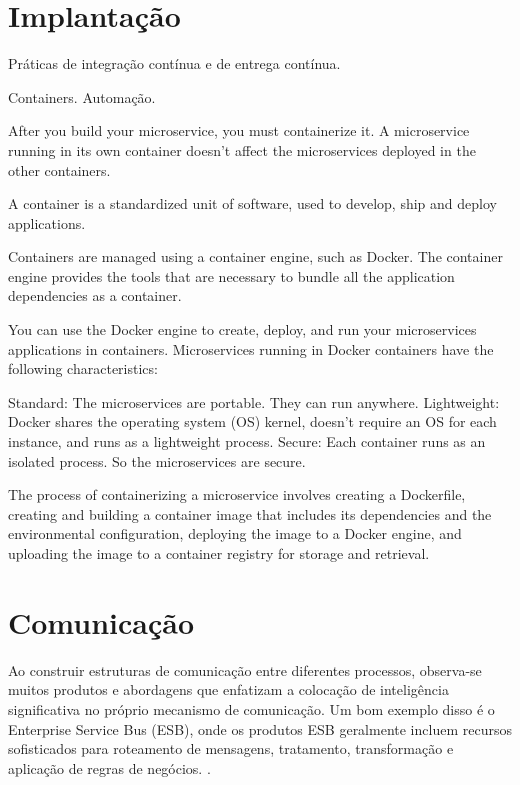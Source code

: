 

\section{Implantação}
Práticas de integração contínua e de entrega contínua. 

Containers. Automação.

After you build your microservice, you must containerize it. A microservice running in its own container doesn’t affect the microservices deployed in the other containers.

A container is a standardized unit of software, used to develop, ship and deploy applications.

Containers are managed using a container engine, such as Docker. The container engine provides the tools that are necessary to bundle all the application dependencies as a container.

You can use the Docker engine to create, deploy, and run your microservices applications in containers. Microservices running in Docker containers have the following characteristics:

Standard: The microservices are portable. They can run anywhere.
Lightweight: Docker shares the operating system (OS) kernel, doesn’t require an OS for each instance, and runs as a lightweight process.
Secure: Each container runs as an isolated process. So the microservices are secure.

The process of containerizing a microservice involves creating a Dockerfile, creating and building a container image that includes its dependencies and the environmental configuration, deploying the image to a Docker engine, and uploading the image to a container registry for storage and retrieval. 

\section{Comunicação}

Ao construir estruturas de comunicação entre diferentes processos, observa-se muitos produtos e abordagens que enfatizam a colocação de inteligência significativa no próprio mecanismo de comunicação. Um bom exemplo disso é o Enterprise Service Bus (ESB), onde os produtos ESB geralmente incluem recursos sofisticados para roteamento de mensagens, tratamento, transformação e aplicação de regras de negócios. \cite{MartinFowlerMicroservices}.

